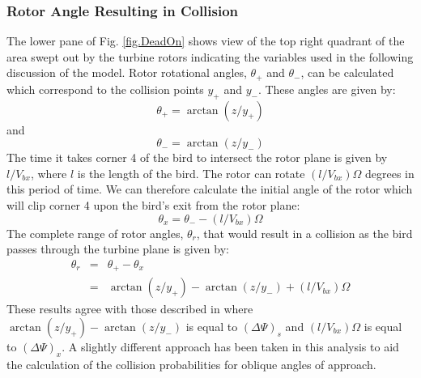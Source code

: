 \documentclass[10pt,conference]{IEEEtran}
\begin{document}
\subsubsection{Rotor Angle Resulting in Collision}
The lower pane of Fig. \ref{fig.DeadOn} shows view of the top right quadrant of the area swept out by the turbine
rotors indicating the variables used in the following discussion of the model. Rotor rotational angles, $\theta_+$ and
$\theta_-$, can be calculated which correspond to the collision points $y_+$ and $y_-$. These angles are given by:
\begin{equation*}
    \theta_+ = \arctan(z/y_+)
\end{equation*}
and
\begin{equation*}
    \theta_- = \arctan(z/y_-)
\end{equation*}
The time it takes corner 4 of the bird to intersect the rotor plane is given by $l/V_{bx}$, where $l$ is the length of
the bird. The rotor can rotate $(l/V_{bx})\Omega$ degrees in this period of time. We can therefore calculate the
initial angle of the rotor which will clip corner 4 upon the bird's exit from the rotor plane:
\begin{equation*}
    \theta_x = \theta_- - (l/V_{bx})\Omega
\end{equation*}
The complete range of rotor angles, $\theta_r$, that would result in a collision as the bird passes through the turbine
plane is given by:
\begin{eqnarray}
\nonumber    \theta_r &=& \theta_+ - \theta_x\\
             &=& \arctan(z/y_+) - \arctan(z/y_-) + (l/V_{bx})\Omega
\end{eqnarray}
These results agree with those described in \cite{Tucker1996} where $\arctan(z/y_+) - \arctan(z/y_-)$ is equal to
$(\Delta\Psi)_s$ and $(l/V_{bx})\Omega$ is equal to $(\Delta\Psi)_x$. A slightly different approach has been taken in
this analysis to aid the calculation of the collision probabilities for oblique angles of approach.
\end{document}
